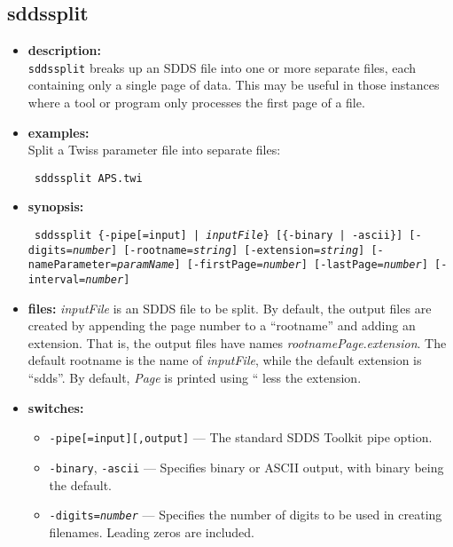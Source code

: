 \begin{latexonly}
\newpage
\end{latexonly}
\subsection{sddssplit}
\label{sddssplit}

\begin{itemize}
\item {\bf description:} \hspace*{1mm}\\
{\tt sddssplit} breaks up an SDDS file into one or more separate files, each containing only a single
page of data.  This may be useful in those instances where a tool or program only processes the first
page of a file.
\item {\bf examples:} \\
Split a Twiss parameter file into separate files:
\begin{flushleft}{\tt
sddssplit APS.twi
}\end{flushleft}
\item {\bf synopsis:} \\
\begin{flushleft}{\tt
sddssplit \{-pipe[=input] | {\em inputFile}\}  [\{-binary | -ascii\}] 
[-digits={\em number}] [-rootname={\em string}] [-extension={\em string}]
[-nameParameter={\em paramName}]
[-firstPage={\em number}] [-lastPage={\em number}] [-interval={\em number}] 
}\end{flushleft}
\item {\bf files:}
{\em inputFile} is an SDDS file to be split.  By default, the output files are created by appending the page number
to a ``rootname'' and adding an extension.  That is, the output files have names 
{\em rootname}{\em Page}.{\em extension}.  The default rootname is the name of {\em inputFile}, while
the default extension is ``sdds''.  By default, {\em Page} is printed using ``%
less the extension.  
\item {\bf switches:}
    \begin{itemize}
    \item {\tt -pipe[=input][,output]} --- The standard SDDS Toolkit pipe option.
    \item {\tt -binary}, {\tt -ascii} --- Specifies binary or ASCII output, with binary being the default.
    \item {\tt -digits={\em number}} --- Specifies the number of digits to be used in creating filenames.
        Leading zeros are included.

\end{itemize}
\end{itemize}
